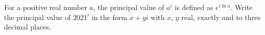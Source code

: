 For a positive real number $a$, the principal value of $a^{i}$ is defined as $e^{i\ln a}$. Write the principal value of $2021^{i}$ in the form $x+yi$ with $x$, $y$ real, exactly and to three decimal places.

